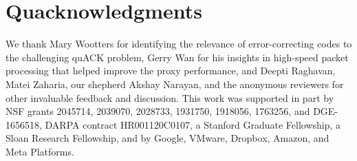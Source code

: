 \section*{Quacknowledgments}

We thank Mary Wootters for identifying the relevance of error-correcting
codes to the challenging quACK problem, Gerry Wan for his insights in
high-speed packet processing that helped improve the proxy performance,
and Deepti Raghavan, Matei Zaharia, our shepherd Akshay Narayan, and the
anonymous reviewers for other invaluable feedback and discussion.
This work was supported in part by NSF grants 2045714, 2039070, 2028733,
1931750, 1918056, 1763256, and DGE-1656518, DARPA contract HR001120C0107,
a Stanford Graduate Fellowship, a Sloan Research Fellowship, and by Google,
VMware, Dropbox, Amazon, and Meta Platforms.
